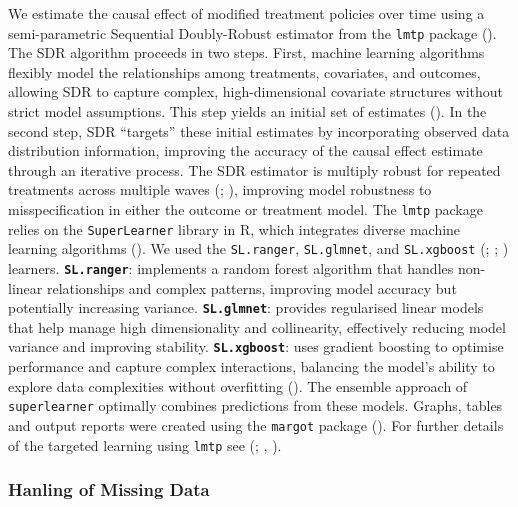 \documentclass[
  single column]{article}
\begin{document}
We estimate the causal effect of modified treatment policies over time
using a semi-parametric Sequential Doubly-Robust estimator from the
\texttt{lmtp} package (). The SDR algorithm proceeds in two steps. First, machine learning
algorithms flexibly model the relationships among treatments,
covariates, and outcomes, allowing SDR to capture complex,
high-dimensional covariate structures without strict model assumptions.
This step yields an initial set of estimates
(). In the second
step, SDR ``targets'' these initial estimates by incorporating observed
data distribution information, improving the accuracy of the causal
effect estimate through an iterative process. The SDR estimator is
multiply robust for repeated treatments across multiple waves
(;
), improving model
robustness to misspecification in either the outcome or treatment model.
The \texttt{lmtp} package relies on the \texttt{SuperLearner} library in
R, which integrates diverse machine learning algorithms
(). We used
the \texttt{SL.ranger}, \texttt{SL.glmnet}, and \texttt{SL.xgboost}
(;
;
) learners.
\textbf{\texttt{SL.ranger}}: implements a random forest algorithm that
handles non-linear relationships and complex patterns, improving model
accuracy but potentially increasing variance.
\textbf{\texttt{SL.glmnet}}: provides regularised linear models that
help manage high dimensionality and collinearity, effectively reducing
model variance and improving stability. \textbf{\texttt{SL.xgboost}}:
uses gradient boosting to optimise performance and capture complex
interactions, balancing the model's ability to explore data complexities
without overfitting (). The ensemble approach of \texttt{superlearner} optimally
combines predictions from these models. Graphs, tables and output
reports were created using the \texttt{margot} package
(). For further details of the
targeted learning using \texttt{lmtp} see
(;
,
).

\subsubsection{Hanling of Missing Data}\label{hanling-of-missing-data}
\end{document}
